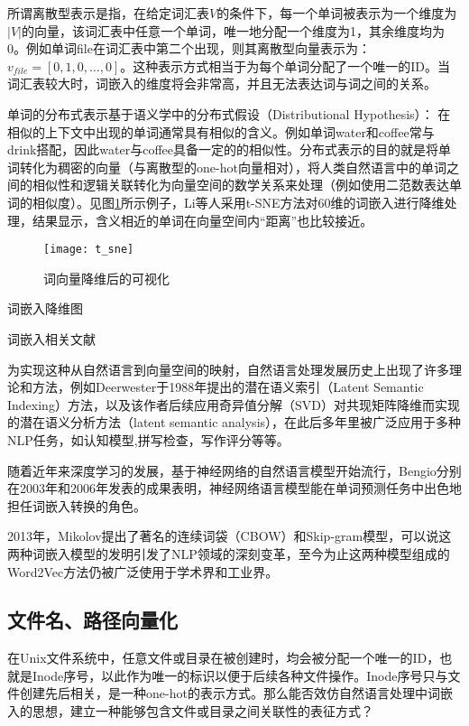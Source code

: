 所谓离散型表示是指，在给定词汇表$V$的条件下，每一个单词被表示为一个维度为$|V|$的向量，该词汇表中任意一个单词，唯一地分配一个维度为1，其余维度均为0。例如单词file在词汇表中第二个出现，则其离散型向量表示为：$v_{file} = [0,1,0,\dots,0]$。这种表示方式相当于为每个单词分配了一个唯一的ID。当词汇表较大时，词嵌入的维度将会非常高，并且无法表达词与词之间的关系。

单词的分布式表示基于语义学中的分布式假设（Distributional Hypothesis）\cite{distributional_hypothesis}：
在相似的上下文中出现的单词通常具有相似的含义。例如单词water和coffee常与drink搭配，因此water与coffee具备一定的的相似性。分布式表示的目的就是将单词转化为稠密的向量（与离散型的one-hot向量相对），将人类自然语言中的单词之间的相似性和逻辑关联转化为向量空间的数学关系来处理（例如使用二范数表达单词的相似度）。见图\ref{fig:t_sne}所示例子，Li等人\cite{visualizing}采用t-SNE方法对60维的词嵌入进行降维处理，结果显示，含义相近的单词在向量空间内“距离”也比较接近。
\begin{figure}[htp]
\centering
\texttt{[image: t\_sne]}
\caption{词向量降维后的可视化}
\label{fig:t_sne}
\end{figure}
{\color{red}词嵌入降维图}

{\color{red}词嵌入相关文献}

为实现这种从自然语言到向量空间的映射，自然语言处理发展历史上出现了许多理论和方法，例如Deerwester于1988年提出的潜在语义索引（Latent Semantic Indexing）方法\cite{LSI}，以及该作者后续应用奇异值分解（SVD）对共现矩阵降维而实现的潜在语义分析方法（latent semantic analysis）\cite{LSA}，在此后多年里被广泛应用于多种NLP任务，如认知模型\cite{cognitive_model},拼写检查\cite{spell_checking}，写作评分\cite{essay_grading}等等。

随着近年来深度学习的发展，基于神经网络的自然语言模型开始流行，Bengio分别在2003年\cite{bengio2003}和2006年\cite{bengio2006}发表的成果表明，神经网络语言模型能在单词预测任务中出色地担任词嵌入转换的角色。

2013年，Mikolov提出了著名的连续词袋（CBOW）和Skip-gram模型\cite{skipgram}，可以说这两种词嵌入模型的发明引发了NLP领域的深刻变革，至今为止这两种模型组成的Word2Vec方法仍被广泛使用于学术界和工业界。

\subsection{文件名、路径向量化}
在Unix文件系统中，任意文件或目录在被创建时，均会被分配一个唯一的ID，也就是Inode序号，以此作为唯一的标识以便于后续各种文件操作。Inode序号只与文件创建先后相关，是一种one-hot的表示方式。那么能否效仿自然语言处理中词嵌入的思想，建立一种能够包含文件或目录之间关联性的表征方式？

